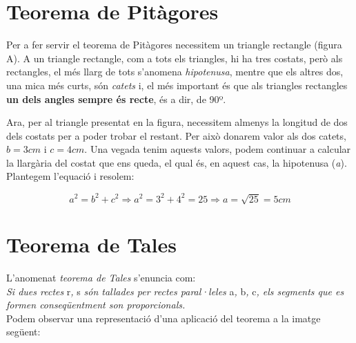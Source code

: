 \documentclass[12pt,a4paper]{article}
\begin{document}
\section{Teorema de Pitàgores}

Per a fer servir el teorema de Pitàgores necessitem un triangle rectangle (figura A). A un triangle rectangle, com a tots els triangles, hi ha tres costats, però als rectangles, el més llarg de tots s'anomena \textit{hipotenusa}, mentre que els altres dos, una mica més curts, són \textit{catets} i, el més important és que als triangles rectangles \textbf{un dels angles sempre és recte}, és a dir, de 90º.\\

\begin{figure}[h]
	\centering
\end{figure}

Ara, per al triangle presentat en la figura, necessitem almenys la longitud de dos dels costats per a poder trobar el restant. Per això donarem valor als dos catets, \(b=3cm \text{ i } c=4cm\). Una vegada tenim aquests valors, podem continuar a calcular la llargària del costat que ens queda, el qual és, en aquest cas, la hipotenusa (\textit{a}). Plantegem l'equació i resolem:

\[
	a^2=b^2+c^2 \Rightarrow a^2=3^2+4^2=25 \Rightarrow a=\sqrt{25}=5cm
\]

\section{Teorema de Tales}

L'anomenat \textit{teorema de Tales} s'enuncia com:\\

\indent\textit{Si dues rectes }r\textit{, }s\textit{ són tallades per rectes paral·leles }a\textit{, }b\textit{, }c\textit{, els segments que es formen conseqüentment son proporcionals.}\\

Podem observar una representació d'una aplicació del teorema a la imatge següent:
\end{document}
